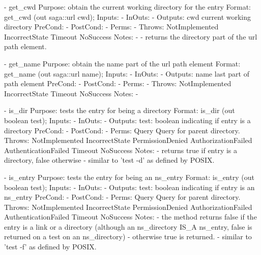 \begin{myspec}
 
 
    - get_cwd
      Purpose:  obtain the current working directory for the
                entry
      Format:   get_cwd            (out saga::url cwd);
      Inputs:   -
      InOuts:   -
      Outputs:  cwd                 current working directory
      PreCond:  -
      PostCond: -
      Perms:    -
      Throws:   NotImplemented
                IncorrectState
                Timeout
                NoSuccess
      Notes:    -
                - returns the directory part of the url path
                  element.
 
 
 
    - get_name
      Purpose:  obtain the name part of the url path element
      Format:   get_name           (out  saga::url name);
      Inputs:   -
      InOuts:   -
      Outputs:  name                last part of path element
      PreCond:  -
      PostCond: -
      Perms:    -
      Throws:   NotImplemented
                IncorrectState
                Timeout
                NoSuccess
      Notes:    -
 
 
 
    - is_dir
      Purpose:  tests the entry for being a directory
      Format:   is_dir             (out boolean test);
      Inputs:   -
      InOuts:   -
      Outputs:  test:               boolean indicating if entry
                                    is a directory
      PreCond:  -
      PostCond: -
      Perms:    Query
                Query for parent directory.
      Throws:   NotImplemented
                IncorrectState
                PermissionDenied
                AuthorizationFailed
                AuthenticationFailed
                Timeout
                NoSuccess
      Notes:    - returns true if entry is a directory, false
                  otherwise
                - similar to 'test -d' as defined by POSIX.
 
 
    - is_entry
      Purpose:  tests the entry for being an ns_entry
      Format:   is_entry           (out boolean test);
      Inputs:   -
      InOuts:   -
      Outputs:  test:               boolean indicating if entry
                                    is an ns_entry
      PreCond:  -
      PostCond: -
      Perms:    Query
                Query for parent directory.
      Throws:   NotImplemented
                IncorrectState
                PermissionDenied
                AuthorizationFailed
                AuthenticationFailed
                Timeout
                NoSuccess
      Notes:    - the method returns false if the entry is a
                  link or a directory (although an ns_directory
                  IS_A ns_entry, false is returned on a test on 
                  an ns_directory) - otherwise true is returned.
                - similar to 'test -f' as defined by POSIX.
 

\end{myspec}
